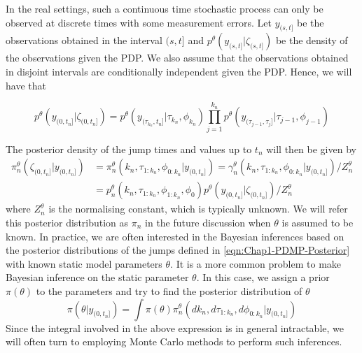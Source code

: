 \documentclass[12pt,a4paper]{article}
\begin{document}
In the real settings, such a continuous time stochastic process can only be observed at discrete times with some measurement errors. Let $y_{(s,t]}$ be the observations obtained in the interval $(s,t]$ and $p^{\theta}(y_{(s,t]}|\zeta_{(s,t]})$ be the density of the observations given the PDP. We also assume that the observations obtained in disjoint intervals are conditionally independent given the PDP. Hence, we will have that 

\begin{equation}
\label{eqn:Chap1-PDMP-Likelihood}
    p^{\theta}(y_{(0,t_n]}|\zeta_{(0,t_n]}) = p^{\theta}(y_{(\tau_{k_n},t_n]}|\tau_{k_n},\phi_{k_n}) \prod_{j=1}^{k_n} p^{\theta}(y_{(\tau_{j-1},\tau_j]}|\tau_{j-1},\phi_{j-1})
\end{equation}


The posterior density of the jump times and values up to $t_n$ will then be given by 
\begin{equation}
\label{eqn:Chap1-PDMP-Posterior}
	\begin{split}
		 \pi_n^{\theta}(\zeta_{(0,t_n]}|y_{(0,t_n]}) &= \pi_n^{\theta}(k_n,\tau_{1:k_n},\phi_{0:k_n}|y_{(0,t_n]}) = \gamma_{n}^{\theta}(k_n,\tau_{1:k_n},\phi_{0:k_n}|y_{(0,t_n]})/Z_n^{\theta}\\
		 &=p_n^{\theta}(k_n,\tau_{1:k_n},\phi_{1:k_n},\phi_0)  p^{\theta}(y_{(0,t_n]}|\zeta_{(0,t_n]}) / Z_n^{\theta}		
	\end{split} 
\end{equation}
where $Z_n^{\theta}$ is the normalising constant, which is typically unknown. We will refer this posterior distribution as $\pi_n$ in the future discussion when \(\theta\) is assumed to be known. In practice, we are often interested in the Bayesian inferences based on the posterior distributions of the jumps defined in \eqref{eqn:Chap1-PDMP-Posterior} with known static model parameters \(\theta\). It is a more common problem to make Bayesian inference on the static parameter \(\theta\). In this case, we assign a prior \(\pi(\theta)\) to the parameters and try to find the posterior distribution of \(\theta\)
\[
  \pi(\theta|y_{(0,t_n]}) = \int \pi(\theta)\pi_n^{\theta}(dk_n,d\tau_{1:k_n},d\phi_{0:k_n}|y_{(0,t_n]})  
\]
Since the integral involved in the above expression is in general intractable, we will often turn to employing Monte Carlo methods to perform such inferences. 
\end{document}
